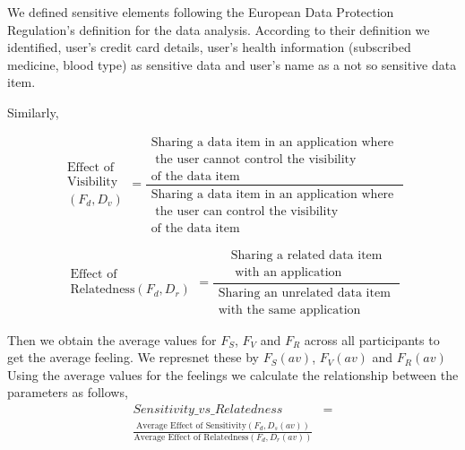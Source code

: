 \documentclass[conference]{IEEEtran}
\begin{document}
We defined sensitive elements following the European Data Protection Regulation's definition for the data analysis. According to their definition we identified, user's credit card details, user's health information (subscribed medicine, blood type) as sensitive data and user's name as a not so sensitive data item. 

Similarly, 

\[ \begin{aligned} \text{Effect of } \\ \text{Visibility}\\ (F_{d},D_{v}) \end{aligned} =
\frac{\begin{aligned}
      \text{Sharing a data item in an application where } \\ \text{ the user cannot control the visibility} \\ \text{of the data item}
      \end{aligned}}%
 {\begin{aligned}
       \text{Sharing a data item in an application where } \\ \text{ the user can control the visibility} \\ \text{of the data item}
      \end{aligned}}
\]



\[ \begin{aligned} \text{Effect of } \\ \text{Relatedness}(F_{d},D_{r})\end{aligned} =
\frac{\begin{aligned}
      \text{Sharing a related data item} \\ \text{  with an application}
      \end{aligned}}%
 {\begin{aligned}
      \text{Sharing an unrelated data item }\\ \text{with the same application}
      \end{aligned}}
\]

Then we obtain the average values for $F_S$, $F_V$ and $F_R$ across all participants to get the average feeling. We represnet these by $F_S(av)$, $F_V(av)$ and $F_R(av)$ Using the average values for the feelings we calculate the relationship between the parameters as follows,
 \begin{equation} \label{eq1}
\begin{split}
Sensitivity\_vs\_Relatedness & = \\ \frac{\text{Average Effect of Sensitivity}(F_{d},D_{s}(av)) }{\text{Average Effect of Relatedness}(F_{d},D_{r}(av))} 
\end{split}
\end{equation}
\end{document}
